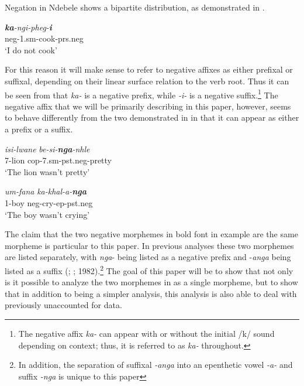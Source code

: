 \documentclass[output=paper]{langsci/langscibook}
\newcommand{\ii}[0]{\textit {-i- }}
\begin{document}
Negation in Ndebele shows a bipartite distribution, as demonstrated in .


\begin{exe}
\ex \gll  \textit{\textbf {ka}-ngi-pheg-\textbf{i}}\\
          {\sc neg}-1.{\sc sm}-cook-{\sc prs.neg}\\
    \glt `I do not cook'
\end{exe}


For this reason it will make sense to refer to negative affixes as either prefixal or suffixal, depending on their linear surface relation to the verb root. Thus it can be seen from  that \textit{ka-} is a negative prefix, while \ii is a negative suffix.\footnote{The negative affix \textit{ka-} can appear with or without the initial /k/ sound depending on context; thus, it is referred to as \textit{ka-} throughout.} The negative affix that we will be primarily describing in this paper, however, seems to behave differently from the two demonstrated in  in that it can appear as either a prefix or a suffix.

\begin{exe}
\ex \begin{xlist}
\ex \gll \textit{isi-lwane}  \textit{be-si-\textbf{nga}-nhle}\\
       7-lion {\sc cop}-7.{\sc sm}-{\sc pst.neg}-pretty\\
    \glt `The lion wasn't pretty' 

\ex \gll \textit{um-fana} \textit{ka-khal-a-\textbf{nga}}\\
         1-boy {\sc neg}-cry-{\sc ep}-{\sc pst.neg}\\
    \glt `The boy wasn't crying'
\end{xlist}
\end{exe}

The claim that the two negative morphemes in bold font in example  are the same morpheme is particular to this paper. In previous analyses these two morphemes are listed separately, with \textit{nga}- being listed as a negative prefix and -\textit{anga} being listed as a suffix (\citealt{Sibanda2004}; \citealt{Khumalo1981}; 1982).\footnote{In addition, the separation of suffixal \textit{-anga} into an epenthetic vowel \textit{-a-} and suffix \textit{-nga} is unique to this paper} The goal of this paper will be to show that not only is it possible to analyze the two morphemes in  as a single morpheme, but to show that in addition to being a simpler analysis, this analysis is also able to deal with previously unaccounted for data.
\end{document}

